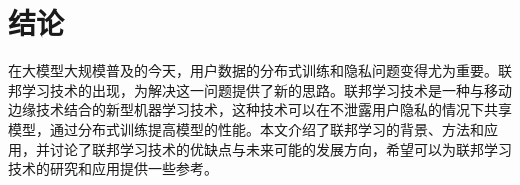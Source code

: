\section{结论}

在大模型大规模普及的今天，用户数据的分布式训练和隐私问题变得尤为重要。联邦学习技术的出现，为解决这一问题提供了新的思路。联邦学习技术是一种与移动边缘技术结合的新型机器学习技术，这种技术可以在不泄露用户隐私的情况下共享模型，通过分布式训练提高模型的性能。本文介绍了联邦学习的背景、方法和应用，并讨论了联邦学习技术的优缺点与未来可能的发展方向，希望可以为联邦学习技术的研究和应用提供一些参考。